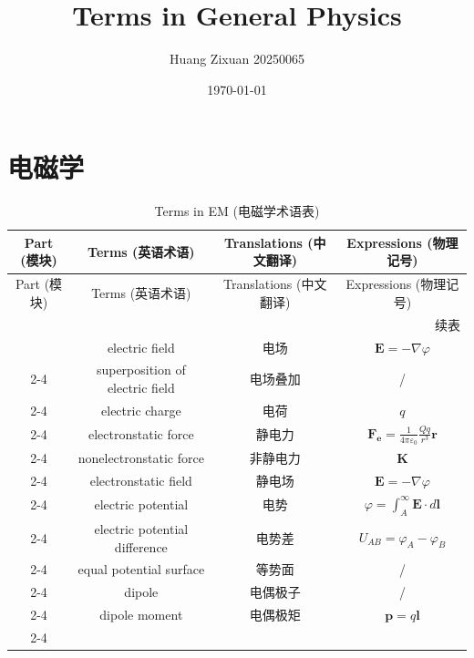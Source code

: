 \documentclass{article}
\title{\huge{Terms in General Physics}}
\author{Huang Zixuan 20250065}
\date{\today}
\begin{document}
  \maketitle

  \section{电磁学}
  \begin{longtable}{|c|c|c|c|}
    \caption{Terms in EM (电磁学术语表)} \label{Tab.1} \\
    \hline
    Part (模块) & Terms (英语术语) & Translations (中文翻译) & Expressions (物理记号) \\ 
    \hline
    \endfirsthead

    \hline
    Part (模块) & Terms (英语术语) & Translations (中文翻译) & Expressions (物理记号) \\ 
    \hline
    \endhead

    \hline
    \multicolumn{4}{r}{续表} \\
    \endfoot

    \hline
    \endlastfoot

    \multirow{8}{*}{静电场}
    & electric field & 电场 & $\boldsymbol{E}=-\nabla \varphi$ \\
    \cline{2-4}
    & superposition of electric field & 电场叠加 & / \\
    \cline{2-4}
    & electric charge & 电荷 & $q$ \\
    \cline{2-4}
    & electronstatic force & 静电力 & $\boldsymbol{F_e}=\frac{1}{4\pi \varepsilon_0}\frac{Qq}{r^3}\boldsymbol{r}$ \\
    \cline{2-4}
    & nonelectronstatic force & 非静电力 & $\boldsymbol{K}$ \\
    \cline{2-4}
    & electronstatic field & 静电场 & $\boldsymbol{E}=-\nabla \varphi$ \\
    \cline{2-4}
    & electric potential & 电势 & $\varphi=\int_{A}^{\infty}\boldsymbol{E}\cdot d\boldsymbol{l}$ \\
    \cline{2-4}
    & electric potential difference & 电势差 & $U_{AB}=\varphi_A-\varphi_B$ \\
    \cline{2-4}
    & equal potential surface & 等势面 & / \\
    \cline{2-4}
    & dipole & 电偶极子 & / \\
    \cline{2-4}
    & dipole moment & 电偶极矩 & $\boldsymbol{p}=q\boldsymbol{l}$ \\
    \cline{2-4}
   

\end{longtable}
\end{document}
